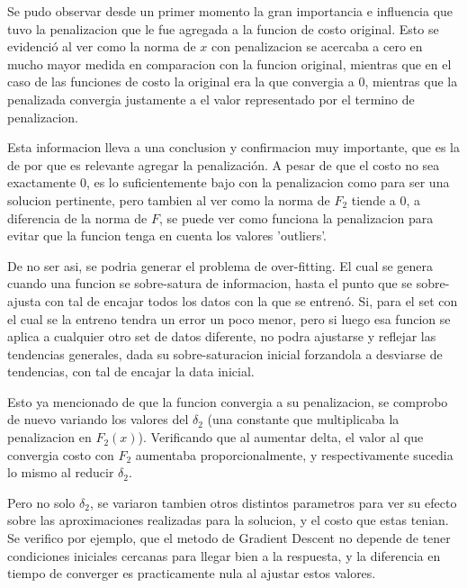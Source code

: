 \documentclass{article}
\begin{document}
\noindent Se pudo observar desde un primer momento la gran importancia e influencia que tuvo la penalizacion que le fue agregada a la funcion de costo original. Esto se evidenció al ver como la norma de $x$ con penalizacion se acercaba a cero en mucho mayor medida en comparacion con la funcion original, mientras que en el caso de las funciones de costo la original era la que convergia a $0$, mientras que la penalizada convergia justamente a el valor representado por el termino de penalizacion. \vspace{\baselineskip}

\noindent Esta informacion lleva a una conclusion y confirmacion muy importante, que es la de por que es relevante agregar la penalización. A pesar de que el costo no sea exactamente $0$, es lo suficientemente bajo con la penalizacion como para ser una solucion pertinente, pero tambien al ver como la norma de $F_2$ tiende a $0$, a diferencia de la norma de $F$, se puede ver como funciona la penalizacion para evitar que la funcion tenga en cuenta los valores 'outliers'.
\vspace{\baselineskip}

\noindent De no ser asi, se podria generar el problema de over-fitting. El cual se genera cuando una funcion se sobre-satura de informacion, hasta el punto que se sobre-ajusta con tal de encajar todos los datos con la que se entrenó. Si, para el set con el cual se la entreno tendra un error un poco menor, pero si luego esa funcion se aplica a cualquier otro set de datos diferente, no podra ajustarse y reflejar las tendencias generales, dada su sobre-saturacion inicial forzandola a desviarse de tendencias, con tal de encajar la data inicial.
\vspace{\baselineskip}

\noindent Esto ya mencionado de que la funcion convergia a su penalizacion, se comprobo de nuevo variando los valores del $\delta_2$ (una constante que multiplicaba la penalizacion en $F_2(x)$). Verificando que al aumentar delta, el valor al que convergia costo con $F_2$ aumentaba proporcionalmente, y respectivamente sucedia lo mismo al reducir $\delta_2$. \vspace{\baselineskip}

\noindent Pero no solo $\delta_2$, se variaron tambien otros distintos parametros para ver su efecto sobre las aproximaciones realizadas para la solucion, y el costo que estas tenian. Se verifico por ejemplo, que el metodo de Gradient Descent no depende de tener condiciones iniciales cercanas para llegar bien a la respuesta, y la diferencia en tiempo de converger es practicamente nula al ajustar estos valores. \vspace{\baselineskip}
\end{document}
